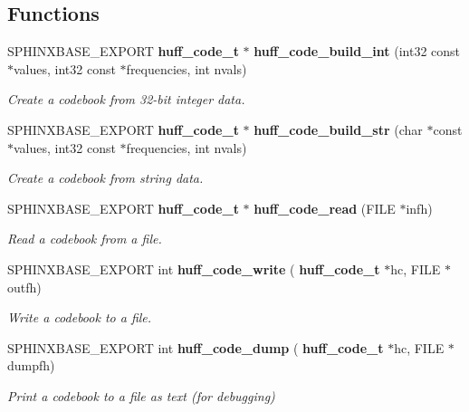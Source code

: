 \subsection*{Functions}
\begin{DoxyCompactItemize}
\item 
\mbox{\label{huff__code_8h_a278b925caf4f2c93cbb63adc8f77bfa6}} 
S\+P\+H\+I\+N\+X\+B\+A\+S\+E\+\_\+\+E\+X\+P\+O\+RT \textbf{ huff\+\_\+code\+\_\+t} $\ast$ \textbf{ huff\+\_\+code\+\_\+build\+\_\+int} (int32 const $\ast$values, int32 const $\ast$frequencies, int nvals)
\begin{DoxyCompactList}\small\item\em Create a codebook from 32-\/bit integer data. \end{DoxyCompactList}\item 
\mbox{\label{huff__code_8h_af5d0c85a2ad206c277ecde2a085af790}} 
S\+P\+H\+I\+N\+X\+B\+A\+S\+E\+\_\+\+E\+X\+P\+O\+RT \textbf{ huff\+\_\+code\+\_\+t} $\ast$ \textbf{ huff\+\_\+code\+\_\+build\+\_\+str} (char $\ast$const $\ast$values, int32 const $\ast$frequencies, int nvals)
\begin{DoxyCompactList}\small\item\em Create a codebook from string data. \end{DoxyCompactList}\item 
\mbox{\label{huff__code_8h_a873745b79dac884cbb1b5bdf12e069e6}} 
S\+P\+H\+I\+N\+X\+B\+A\+S\+E\+\_\+\+E\+X\+P\+O\+RT \textbf{ huff\+\_\+code\+\_\+t} $\ast$ \textbf{ huff\+\_\+code\+\_\+read} (F\+I\+LE $\ast$infh)
\begin{DoxyCompactList}\small\item\em Read a codebook from a file. \end{DoxyCompactList}\item 
\mbox{\label{huff__code_8h_a6b91641e852a8eb4c4d32f40ff6dd055}} 
S\+P\+H\+I\+N\+X\+B\+A\+S\+E\+\_\+\+E\+X\+P\+O\+RT int \textbf{ huff\+\_\+code\+\_\+write} (\textbf{ huff\+\_\+code\+\_\+t} $\ast$hc, F\+I\+LE $\ast$outfh)
\begin{DoxyCompactList}\small\item\em Write a codebook to a file. \end{DoxyCompactList}\item 
\mbox{\label{huff__code_8h_a821658831cbe9b1199c756435d0ad4aa}} 
S\+P\+H\+I\+N\+X\+B\+A\+S\+E\+\_\+\+E\+X\+P\+O\+RT int \textbf{ huff\+\_\+code\+\_\+dump} (\textbf{ huff\+\_\+code\+\_\+t} $\ast$hc, F\+I\+LE $\ast$dumpfh)
\begin{DoxyCompactList}\small\item\em Print a codebook to a file as text (for debugging) \end{DoxyCompactList}\item 

\end{DoxyCompactItemize}
